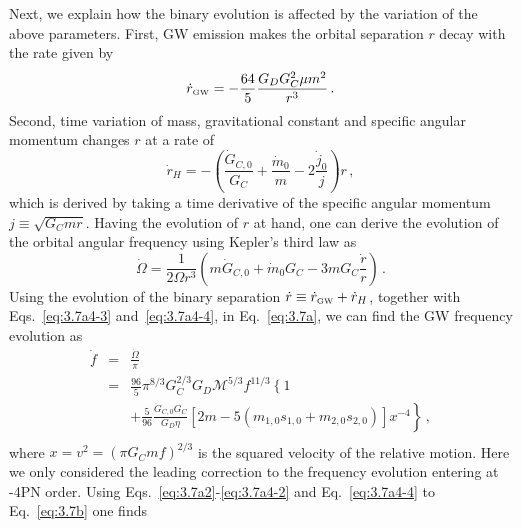 \documentclass[prd,twocolumn,nofootinbib]{revtex4-1}
\newcommand\bw{\begin{widetext}}
\newcommand\ew{\end{widetext}}
\newcommand{\GW}{{\mbox{\tiny GW}}}
\begin{document}
Next, we explain how the binary evolution is affected by the variation of the above parameters. 
First, GW emission makes the orbital separation $r$ decay with the rate given by~\cite{PhysRevD.49.2658}
 \begin{equation}
 \dot{r}_{\GW}=-\frac{64}{5}\frac{G_D G_C^2 \mu m^2}{r^3}\,.
 \end{equation}
Second, time variation of mass, gravitational constant and specific angular momentum changes $r$ at a rate of
 \begin{equation}
 \dot{r}_H=-\left(\frac{\dot{G}_{C,0}}{G_C}+\frac{\dot{m}_0}{m}-2\frac{\dot{j}_0}{j}\right)r\,,
 \end{equation}
 which is derived by taking a time derivative of the specific angular momentum $j\equiv\sqrt{G_Cmr}$. Having the evolution of $r$ at hand, one can derive the evolution of the orbital angular frequency using Kepler's third law as
 \begin{equation}\label{eq:3.7a}
 \dot{\Omega}=\frac{1}{2\Omega r^3}\left(m\dot{G}_{C,0}+\dot{m}_0G_C-3mG_C\frac{\dot{r}}{r}\right)\,.
 \end{equation}
Using the evolution of the binary separation $\dot{r}\equiv \dot{r}_{\GW}+\dot{r}_H$, together with Eqs.~\eqref{eq:3.7a4-3} and~\eqref{eq:3.7a4-4}, in Eq.~\eqref{eq:3.7a}, we can find the GW frequency evolution as
\allowdisplaybreaks
\begin{eqnarray} 
\label{eq:3.7b}
 \dot{f}&=&\frac{\dot{\Omega}}{\pi} \nonumber \\
 &=&\frac{96}{5}\pi^{8/3}G_C^{2/3}G_D\mathcal{M}^{5/3}f^{11/3}\left\{1 \right. \nonumber \\
 && \left. +\frac{5}{96}\frac{\dot{G}_{C,0} G_C}{G_D\eta}[2m-5(m_{1,0}s_{1,0}+m_{2,0}s_{2,0})] x^{-4}  \right\}\,, \nonumber \\
\end{eqnarray}
where $x=v^2=(\pi G_C  m f)^{2/3}$ is the squared velocity of the relative motion. Here we only considered the leading correction to the frequency evolution entering at -4PN order. Using Eqs.~\eqref{eq:3.7a2}-\eqref{eq:3.7a4-2} and Eq.~\eqref{eq:3.7a4-4} to Eq.~\eqref{eq:3.7b} one finds
\end{document}
